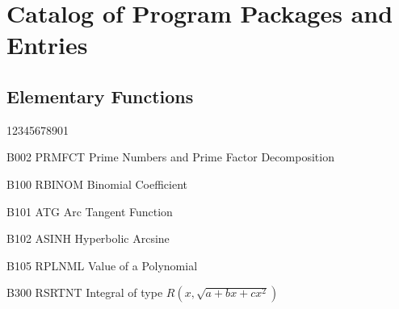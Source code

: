 \chapter{Catalog of Program Packages and Entries}
\section*{Elementary Functions}
\begin{DLtt}{12345678901}
\item[B002 PRMFCT] Prime Numbers and Prime Factor Decomposition
\item[B100 RBINOM] Binomial Coefficient
\item[B101 ATG] Arc Tangent Function
\item[B102 ASINH] Hyperbolic Arcsine
\item[B105 RPLNML] Value of a Polynomial
\item[B300 RSRTNT] Integral of type $R(x,\sqrt{a+bx+cx^2})$
\end{DLtt}
